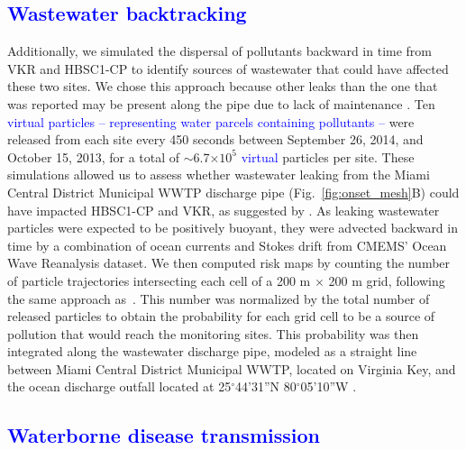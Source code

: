 \documentclass[preprint,12pt,authoryear]{elsarticle}
\newcommand{\modif}[1]{\textcolor{blue}{#1}}
\begin{document}
\modif{\subsection{Wastewater backtracking}}

Additionally, we simulated the dispersal of pollutants backward in time from VKR and HBSC1-CP to identify sources of wastewater that could have affected these two sites. We chose this approach because other leaks than the one that was reported may be present along the pipe due to lack of maintenance \citep{staletovich2017}. Ten \modif{virtual particles -- representing water parcels containing pollutants --} were released from each site every 450 seconds between September 26, 2014, and October 15, 2013, for a total of $\sim$6.7$\times10^5$ \modif{virtual} particles per site. These simulations allowed us to assess whether wastewater leaking from the Miami Central District Municipal WWTP discharge pipe (Fig.~\ref{fig:onset_mesh}B) could have impacted HBSC1-CP and VKR, as suggested by \cite{gintert2019regional}. As leaking wastewater particles were expected to be positively buoyant, they were advected backward in time by a combination of ocean currents and Stokes drift from CMEMS' Ocean Wave Reanalysis dataset. We then computed risk maps by counting the number of particle trajectories intersecting each cell of a 200 m $\times$ 200 m grid, following the same approach as~\cite{anselain2023qatar}. This number was normalized by the total number of released particles to obtain the probability for each grid cell to be a source of pollution that would reach the monitoring sites.
This probability was then integrated along the wastewater discharge pipe, modeled as a straight line between Miami Central District Municipal WWTP, located on Virginia Key, and the ocean discharge outfall located at 25$^\circ$44'31''N 80$^\circ$05'10''W \citep{koopman2006ocean}.

\modif{\subsection{Waterborne disease transmission}}
\end{document}
